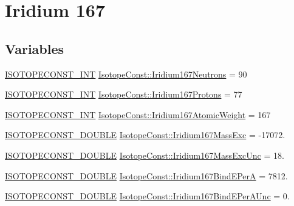\hypertarget{group___isotope_const-_iridium-_ir167}{}\section{Iridium 167}
\label{group___isotope_const-_iridium-_ir167}
\subsection*{Variables}
\begin{DoxyCompactItemize}
\item 
\mbox{\hyperlink{group___isotope_const-_macros_ga5f18360b3e99483a35c32d789e62621c}{I\+S\+O\+T\+O\+P\+E\+C\+O\+N\+S\+T\+\_\+\+I\+NT}} \mbox{\hyperlink{group___isotope_const-_iridium-_ir167_gacdbac7a0147652ce9dbab3a8df6b960b}{Isotope\+Const\+::\+Iridium167\+Neutrons}} = 90
\item 
\mbox{\hyperlink{group___isotope_const-_macros_ga5f18360b3e99483a35c32d789e62621c}{I\+S\+O\+T\+O\+P\+E\+C\+O\+N\+S\+T\+\_\+\+I\+NT}} \mbox{\hyperlink{group___isotope_const-_iridium-_ir167_ga60fca4f8546d112d92aa2f0d638e2747}{Isotope\+Const\+::\+Iridium167\+Protons}} = 77
\item 
\mbox{\hyperlink{group___isotope_const-_macros_ga5f18360b3e99483a35c32d789e62621c}{I\+S\+O\+T\+O\+P\+E\+C\+O\+N\+S\+T\+\_\+\+I\+NT}} \mbox{\hyperlink{group___isotope_const-_iridium-_ir167_gab935ebf04379f649e0056968a2a89553}{Isotope\+Const\+::\+Iridium167\+Atomic\+Weight}} = 167
\item 
\mbox{\hyperlink{group___isotope_const-_macros_ga8f45a7272ce02c0b4c65c44636ed719a}{I\+S\+O\+T\+O\+P\+E\+C\+O\+N\+S\+T\+\_\+\+D\+O\+U\+B\+LE}} \mbox{\hyperlink{group___isotope_const-_iridium-_ir167_ga5fb3af6896e7c957e66a4680326aa644}{Isotope\+Const\+::\+Iridium167\+Mass\+Exc}} = -\/17072.
\item 
\mbox{\hyperlink{group___isotope_const-_macros_ga8f45a7272ce02c0b4c65c44636ed719a}{I\+S\+O\+T\+O\+P\+E\+C\+O\+N\+S\+T\+\_\+\+D\+O\+U\+B\+LE}} \mbox{\hyperlink{group___isotope_const-_iridium-_ir167_gacb8a97f6d5d0db6a86f6b9941a050ae3}{Isotope\+Const\+::\+Iridium167\+Mass\+Exc\+Unc}} = 18.
\item 
\mbox{\hyperlink{group___isotope_const-_macros_ga8f45a7272ce02c0b4c65c44636ed719a}{I\+S\+O\+T\+O\+P\+E\+C\+O\+N\+S\+T\+\_\+\+D\+O\+U\+B\+LE}} \mbox{\hyperlink{group___isotope_const-_iridium-_ir167_gaa8271bcd6acec38fa719eff53ab87de2}{Isotope\+Const\+::\+Iridium167\+Bind\+E\+PerA}} = 7812.
\item 
\mbox{\hyperlink{group___isotope_const-_macros_ga8f45a7272ce02c0b4c65c44636ed719a}{I\+S\+O\+T\+O\+P\+E\+C\+O\+N\+S\+T\+\_\+\+D\+O\+U\+B\+LE}} \mbox{\hyperlink{group___isotope_const-_iridium-_ir167_gacac5cf8ca739e5c844ecfaa1cd99bd32}{Isotope\+Const\+::\+Iridium167\+Bind\+E\+Per\+A\+Unc}} = 0.

\end{DoxyCompactItemize}
